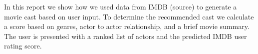 In this report we show how we used data from IMDB (source) to generate a movie cast based on user input.  
To determine the recommended cast we calculate a score based on genres, actor to actor relationship, and a brief movie summary. The user
is presented with a ranked list of actors and the predicted IMDB user rating score.